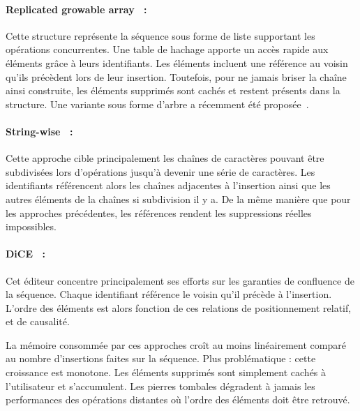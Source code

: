 \paragraph{Replicated growable array~\cite{roh2011replicated} :} Cette structure
représente la séquence sous forme de liste supportant les opérations
concurrentes. Une table de hachage apporte un accès rapide aux éléments grâce à
leurs identifiants. Les éléments incluent une référence au voisin qu'ils
précèdent lors de leur insertion. Toutefois, pour ne jamais briser la chaîne
ainsi construite, les éléments supprimés sont cachés et restent présents dans la
structure. Une variante sous forme d'arbre a récemment été
proposée~\cite{attiya2016specification}.

\paragraph{String-wise~\cite{yu2012stringwise} :} Cette approche cible
principalement les chaînes de caractères pouvant être subdivisées lors
d'opérations jusqu'à devenir une série de caractères. Les identifiants
référencent alors les chaînes adjacentes à l'insertion ainsi que les autres
éléments de la chaînes si subdivision il y a. De la même manière que pour les
approches précédentes, les références rendent les suppressions réelles
impossibles.

\paragraph{DiCE~\cite{conway2014language} :} Cet éditeur concentre
principalement ses efforts sur les garanties de confluence de la
séquence. Chaque identifiant référence le voisin qu'il précède à
l'insertion. L'ordre des éléments est alors fonction de ces relations de
positionnement relatif, et de causalité.


La mémoire consommée par ces approches croît au moins linéairement comparé au
nombre d'insertions faites sur la séquence. Plus problématique : cette
croissance est monotone. Les éléments supprimés sont simplement cachés à
l'utilisateur et s'accumulent. Les pierres tombales dégradent à jamais les
performances des opérations distantes où l'ordre des éléments doit être
retrouvé.


